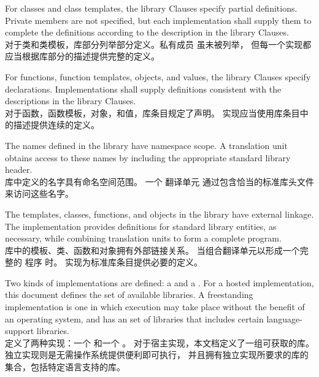 \pnum
{}%
%
%
For classes and class templates, the library Clauses specify partial
definitions. Private members are not
specified, but each implementation shall supply them to complete the
definitions according to the description in the library Clauses. \\
对于类和类模板，库部分列举部分定义。私有成员 虽未被列举，
但每一个实现都应当根据库部分的描述提供完整的定义。

\pnum
For functions, function templates, objects, and values, the library
Clauses specify declarations. Implementations shall supply definitions
consistent with the descriptions in the library Clauses. \\
对于函数，函数模板，对象，和值，库条目规定了声明。
实现应当使用库条目中的描述提供连续的定义。

\pnum
The names defined in the library have namespace
scope. A \Cpp{}  translation
unit obtains access to these names by including the
appropriate standard library header. \\
库中定义的名字具有命名空间范围。
一个 \Cpp{} 翻译单元 
通过包含恰当的标准库头文件 来访问这些名字。

\pnum
The templates, classes, functions, and objects in the library have
external linkage. The implementation provides
definitions for standard library entities, as necessary, while combining
translation units to form a complete \Cpp{}  program.%
 \\
库中的模板、类、函数和对象拥有外部链接关系。
当组合翻译单元以形成一个完整的 \Cpp{} 程序 时。
实现为标准库条目提供必要的定义。

\pnum
Two kinds of implementations are defined: a  and a
. For a hosted implementation, this
document defines the set of available libraries. A freestanding
implementation is one in which execution may take place without the benefit of
an operating system, and has an  set of libraries that includes certain language-support
libraries. \\
定义了两种实现：一个  
和一个 。
对于宿主实现，本文档定义了一组可获取的库。独立实现则是无需操作系统提供便利即可执行，
并且拥有独立实现所要求的库的集合，包括特定语言支持的库。

